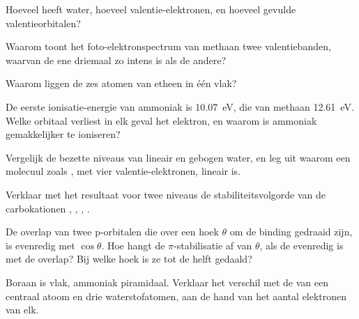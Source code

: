 \begin{exercise}[$\star$]\label{exo:b2:fragment-orbitals:2}
Hoeveel  heeft water, hoeveel valentie-elektronen,
en hoeveel gevulde valentieorbitalen?
\end{exercise}

\begin{exercise}[$\star$]\label{exo:b2:fragment-orbitals:3}
Waarom toont het foto-elektronspectrum van methaan twee valentiebanden, waarvan de ene
driemaal zo intens is als de andere?
\end{exercise}

\begin{exercise}[$\star$]\label{exo:b2:fragment-orbitals:4}
Waarom liggen de zes atomen van etheen in één vlak?
\end{exercise}

\begin{exercise}[$\star\star$]\label{exo:b2:fragment-orbitals:5}
De eerste ionisatie-energie van ammoniak is \qty{10.07}{eV}, die van methaan
\qty{12.61}{eV}. Welke orbitaal verliest in elk geval het elektron, en waarom is ammoniak
gemakkelijker te ioniseren?
\end{exercise}

\begin{exercise}[$\star\star$]\label{exo:b2:fragment-orbitals:6}
Vergelijk de bezette niveaus van lineair en gebogen water, en leg uit waarom een molecuul
zoals , met vier valentie-elektronen, lineair is.
\end{exercise}

\begin{exercise}[$\star\star$]\label{exo:b2:fragment-orbitals:7}
Verklaar met het resultaat voor twee niveaus de stabiliteitsvolgorde van de carbokationen
, , , .
\end{exercise}

\begin{exercise}[$\star\star$]\label{exo:b2:fragment-orbitals:8}
De overlap van twee p-orbitalen die over een hoek $\theta$ om de binding gedraaid zijn, is
evenredig met $\cos\theta$. Hoe hangt de $\pi$-stabilisatie af van $\theta$, als de
 evenredig is met de overlap? Bij welke hoek is ze tot de helft
gedaald?
\end{exercise}

\begin{exercise}[$\star\star$]\label{exo:b2:fragment-orbitals:9}
Boraan  is vlak, ammoniak piramidaal. Verklaar het verschil met de  van een
centraal atoom en drie waterstofatomen, aan de hand van het aantal elektronen van elk.
\end{exercise}

